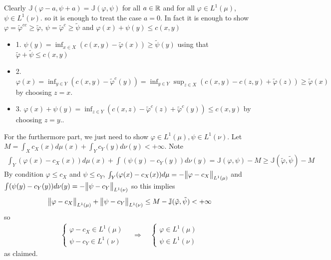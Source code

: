 \documentclass[12pt,a4paper]{article}
\newenvironment{proof}
{\begin{changemargin}{1cm}{0.5cm} 
	}%
	{\end{changemargin}
}
\renewenvironment{i}
{\begin{itemize} 
	}%
	{\end{itemize}
}
\newenvironment{p}
{\begin{proof} 
	}%
	{\end{proof}
}
\begin{document}
\begin{p}
\pf Clearly $\mathbb{J}(\varphi -a, \psi +a) = \mathbb{J}(\varphi, \psi)$ for all $a\in \mathbb{R}$ and for all $\varphi\in L^1(\mu)$, $\psi \in L^1(\nu)$. so it is enough to treat the case $a=0$. In fact it is enough to show $\varphi = \tilde{\varphi}^{cc} \geq \tilde{\varphi}$, $\psi = \tilde{\varphi}^c \geq \tilde{\psi}$ and $\varphi(x) + \psi(y) \leq c(x,y)$ 
\begin{i}
\item[1.] $\psi(y) = \inf_{x\in X} (c(x,y)- \tilde{\varphi}(x)) \geq \tilde{\psi}(y)$ using that $\tilde{\varphi} + \tilde{\psi} \leq c(x,y)$
\item[2.] $\varphi(x) = \inf_{y \in Y}(c(x,y) - \tilde{\varphi}^c (y)) = \inf_{y\in Y}\sup_{z\in X}(c(x,y) - c(z,y) + \tilde{\varphi}(z)) \geq \tilde{\varphi}(x)$ by choosing $z=x$.
\item[3.] $\varphi(x) + \psi(y) = \inf_{z\in Y}(c(x,z) - \tilde{\varphi}^c(z) + \tilde{\varphi}^c (y)) \leq c(x,y)$ by choosing $z=y.$.
\end{i}
\s

For the furthermore part, we just need to show $\varphi \in L^1(\mu), \psi\in L^1(\nu)$. Let $M = \int_X c_X(x) d\mu(x)+ \int_Y c_Y(y)d\nu(y) < + \infty$. Note
\begin{align*}
\int_Y (\varphi(x) - c_X(x))d\mu(x) + \int (\psi(y)- c_Y(y)) d\nu(y) = \mathbb{J}(\varphi, \psi) -M \geq \mathbb{J}(\tilde{\varphi}, \tilde{\psi}) - M
\end{align*}
By condition $\varphi \leq c_X$ and $\psi \leq c_Y$, $\int_Y (\varphi(x)- c_X(x))d\mu = - \bigl\lVert\varphi - c_X\bigr\rVert_{L^1(\mu)}$ and $\int (\psi(y)- c_Y(y)) d\nu(y) = -\bigl\lVert\psi - c_Y\bigr\rVert_{L^1(\nu)}$  so this implies
\begin{align*}
\bigl\lVert\varphi - c_X\bigr\rVert_{L^1(\mu)} + \bigl\lVert\psi - c_Y\bigr\rVert_{L^1(\nu)}\leq M - \mathbb{J}(\tilde{\varphi}, \tilde{\psi}) < +\infty
\end{align*}
so
\begin{align*}
\begin{cases}
\varphi - c_X \in L^1(\mu) \\
\psi - c_Y \in L^1(\nu) 
\end{cases} \quad \Rightarrow \quad \begin{cases}
\varphi  \in L^1(\mu) \\
\psi  \in L^1(\nu) 
\end{cases}
\end{align*}
as claimed.

\eop
\end{p}
\s
\end{document}
